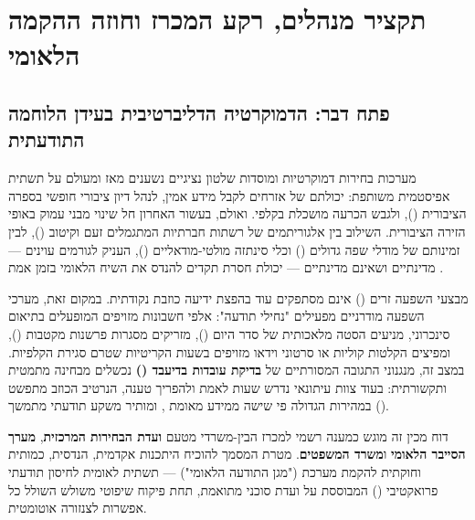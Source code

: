 \chapter{תקציר מנהלים, רקע המכרז וחוזה ההקמה הלאומי}
\label{ch:executive}

\section{פתח דבר: הדמוקרטיה הדליברטיבית בעידן הלוחמה התודעתית}
מערכות בחירות דמוקרטיות ומוסדות שלטון נציגיים נשענים מאז ומעולם על תשתית אפיסטמית משותפת: יכולתם של אזרחים לקבל מידע אמין, לנהל דיון ציבורי חופשי בספרה הציבורית (), ולגבש הכרעה מושכלת בקלפי. ואולם, בעשור האחרון חל שינוי מבני עמוק באופי הזירה הציבורית. השילוב בין אלגוריתמים של רשתות חברתיות המתגמלים זעם וקיטוב (), לבין זמינותם של מודלי שפה גדולים () וכלי סינתזה מולטי-מודאליים (), העניק לגורמים עוינים — מדינתיים ושאינם מדינתיים — יכולת חסרת תקדים להנדס את השיח הלאומי בזמן אמת \cite{vosoughi2018, walker2018}.

מבצעי השפעה זרים () אינם מסתפקים עוד בהפצת ידיעה כוזבת נקודתית. במקום זאת, מערכי השפעה מודרניים מפעילים "נחילי תודעה": אלפי חשבונות מזויפים המופעלים בתיאום סינכרוני, מניעים הסטה מלאכותית של סדר היום (), מזריקים מסגרות פרשנות מקטבות (), ומפיצים הקלטות קוליות או סרטוני וידאו מזויפים בשעות הקריטיות שטרם סגירת הקלפיות. במצב זה, מנגנוני התגובה המסורתיים של \textbf{בדיקת עובדות בדיעבד ()} נכשלים מבחינה מתמטית ותקשורתית: בעוד צוות עיתונאי נדרש שעות לאמת ולהפריך טענה, הנרטיב הכוזב מתפשט במהירות הגדולה פי שישה ממידע מאומת \cite{vosoughi2018}, ומותיר משקע תודעתי מתמשך ().

\begin{rfpbox}
דוח מכין זה מוגש כמענה רשמי למכרז הבין-משרדי  מטעם \textbf{ועדת הבחירות המרכזית}, \textbf{מערך הסייבר הלאומי} ו\textbf{משרד המשפטים}. מטרת המסמך להוכיח היתכנות אקדמית, הנדסית, כמותית וחוקתית להקמת מערכת  ("מגן התודעה הלאומי") — תשתית לאומית לחיסון תודעתי פרואקטיבי () המבוססת על ועדת סוכני  מתואמת, תחת פיקוח שיפוטי משולש השולל כל אפשרות לצנזורה אוטומטית.
\end{rfpbox}

